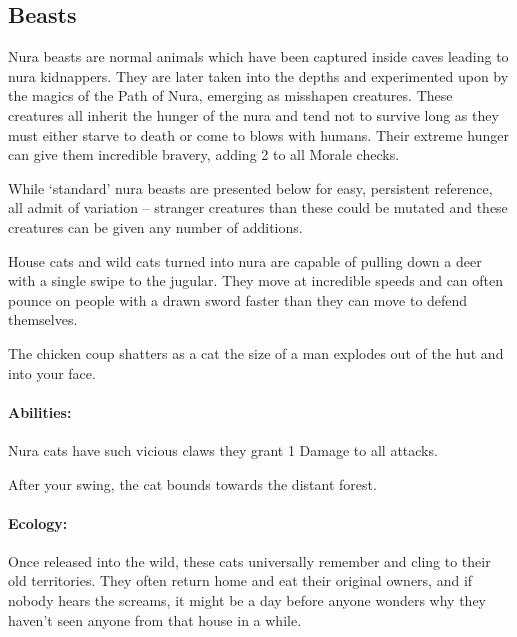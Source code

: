 \begin{multicols}{2}

\subsection{Beasts}

Nura beasts are normal animals which have been captured inside caves leading to nura kidnappers.
They are later taken into the depths and experimented upon by the magics of the Path of Nura, emerging as misshapen creatures.
These creatures all inherit the hunger of the nura and tend not to survive long as they must either starve to death or come to blows with humans.
Their extreme hunger can give them incredible bravery, adding 2 to all Morale checks.

While `standard' nura beasts are presented below for easy, persistent reference, all admit of variation -- stranger creatures than these could be mutated and these creatures can be given any number of additions.

\label{nura_cat}

House cats and wild cats turned into nura are capable of pulling down a deer with a single swipe to the jugular.
They move at incredible speeds and can often pounce on people with a drawn sword faster than they can move to defend themselves.

\begin{boxtext}

  The chicken coup shatters as a cat the size of a man explodes out of the hut and into your face.

\end{boxtext}

\paragraph{Abilities:}Nura cats have such vicious claws they grant 1 Damage to all attacks.

\begin{boxtext}

  After your swing, the cat bounds towards the distant forest.

\end{boxtext}

\paragraph{Ecology:} Once released into the wild, these cats universally remember and cling to their old territories.
They often return home and eat their original owners, and if nobody hears the screams, it might be a day before anyone wonders why they haven't seen anyone from that house in a while.


\end{multicols}
